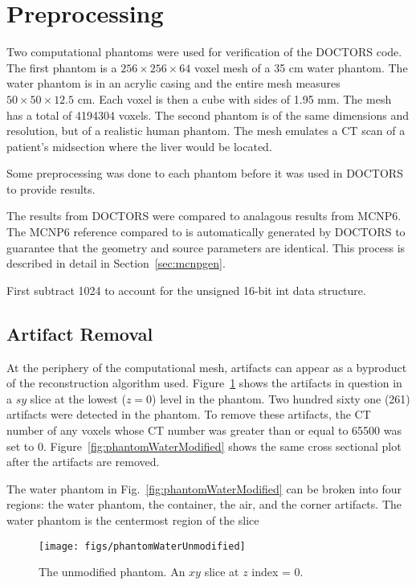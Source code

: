 

\section{Preprocessing}
Two computational phantoms were used for verification of the DOCTORS code. The first phantom is a $256 \times 256 \times 64$ voxel mesh of a 35 cm water phantom. The water phantom is in an acrylic casing and the entire mesh measures $50 \times 50 \times 12.5$ cm. Each voxel is then a cube with sides of 1.95 mm. The mesh has a total of 4194304 voxels. The second phantom is of the same dimensions and resolution, but of a realistic human phantom. The mesh emulates a CT scan of a patient's midsection where the liver would be located.

Some preprocessing was done to each phantom before it was used in DOCTORS to provide results.

The results from DOCTORS were compared to analagous results from MCNP6. The MCNP6 reference compared to is automatically generated by DOCTORS to guarantee that the geometry and source parameters are identical. This process is described in detail in Section~\ref{sec:mcnpgen}.

First subtract 1024 to account for the unsigned 16-bit int data structure.

\subsection{Artifact Removal}
At the periphery of the computational mesh, artifacts can appear as a byproduct of the reconstruction algorithm used. Figure~\ref{fig:phantomWaterUnmodified} shows the artifacts in question in a $sy$ slice at the lowest ($z = 0$) level in the phantom. Two hundred sixty one (261) artifacts were detected in the phantom. To remove these artifacts, the CT number of any voxels whose CT number was greater than or equal to 65500 was set to 0. Figure~\ref{fig:phantomWaterModified} shows the same cross sectional plot after the artifacts are removed.

The water phantom in Fig.~\ref{fig:phantomWaterModified} can be broken into four regions: the water phantom, the container, the air, and the corner artifacts. The water phantom is the centermost region of the slice

\begin{figure}[tb]
  \begin{center}
   \texttt{[image: figs/phantomWaterUnmodified]}
  \end{center}
  \caption{The unmodified phantom. An $xy$ slice at $z$ index = 0.}
\label{fig:phantomWaterUnmodified}
\end{figure}

